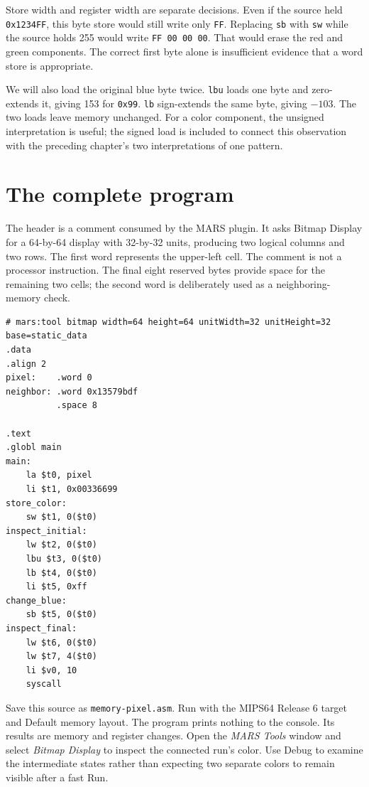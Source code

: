 Store width and register width are separate decisions. Even if the source held
\texttt{0x1234FF}, this byte store would still write only \texttt{FF}. Replacing
\texttt{sb} with \texttt{sw} while the source holds 255 would write
\texttt{FF 00 00 00}. That would erase the red and green components. The correct
first byte alone is insufficient evidence that a word store is appropriate.

We will also load the original blue byte twice. \texttt{lbu} loads one byte and
zero-extends it, giving 153 for \texttt{0x99}. \texttt{lb} sign-extends the same
byte, giving $-103$. The two loads leave memory unchanged. For a color component,
the unsigned interpretation is useful; the signed load is included to connect
this observation with the preceding chapter's two interpretations of one pattern.

\section{The complete program}

The header is a comment consumed by the MARS plugin. It asks Bitmap Display for
a 64-by-64 display with 32-by-32 units, producing two logical columns and two rows.
The first word represents the upper-left cell. The comment is not a processor
instruction. The final eight reserved bytes provide space for the remaining two
cells; the second word is deliberately used as a neighboring-memory check.

\begin{verbatim}
# mars:tool bitmap width=64 height=64 unitWidth=32 unitHeight=32 base=static_data
.data
.align 2
pixel:    .word 0
neighbor: .word 0x13579bdf
          .space 8

.text
.globl main
main:
    la $t0, pixel
    li $t1, 0x00336699
store_color:
    sw $t1, 0($t0)
inspect_initial:
    lw $t2, 0($t0)
    lbu $t3, 0($t0)
    lb $t4, 0($t0)
    li $t5, 0xff
change_blue:
    sb $t5, 0($t0)
inspect_final:
    lw $t6, 0($t0)
    lw $t7, 4($t0)
    li $v0, 10
    syscall
\end{verbatim}

Save this source as \texttt{memory-pixel.asm}. Run with the MIPS64 Release 6
target and Default memory layout. The program prints nothing to the console.
Its results are memory and register changes. Open the \emph{MARS Tools} window and select
\emph{Bitmap Display} to inspect the connected run's color. Use Debug to examine the
intermediate states rather than expecting two separate colors to remain visible
after a fast Run.

